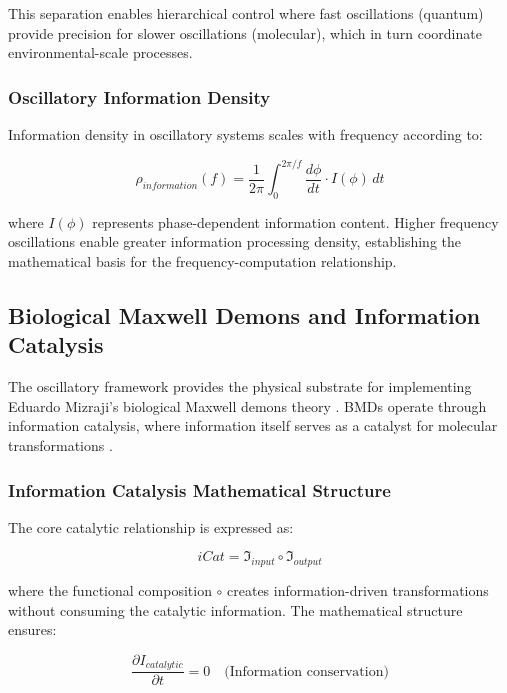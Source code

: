 This separation enables hierarchical control where fast oscillations (quantum) provide precision for slower oscillations (molecular), which in turn coordinate environmental-scale processes.

\subsubsection{Oscillatory Information Density}

Information density in oscillatory systems scales with frequency according to:

\begin{equation}
\rho_{information}(f) = \frac{1}{2\pi} \int_0^{2\pi/f} \frac{d\phi}{dt} \cdot I(\phi) \, dt
\end{equation}

where $I(\phi)$ represents phase-dependent information content. Higher frequency oscillations enable greater information processing density, establishing the mathematical basis for the frequency-computation relationship.

\subsection{Biological Maxwell Demons and Information Catalysis}

The oscillatory framework provides the physical substrate for implementing Eduardo Mizraji's biological Maxwell demons theory \cite{mizraji2007biological}. BMDs operate through information catalysis, where information itself serves as a catalyst for molecular transformations \cite{mizraji2007biological}.

\subsubsection{Information Catalysis Mathematical Structure}

The core catalytic relationship is expressed as:

\begin{equation}
iCat = \mathfrak{I}_{input} \circ \mathfrak{I}_{output}
\end{equation}

where the functional composition $\circ$ creates information-driven transformations without consuming the catalytic information. The mathematical structure ensures:

\begin{equation}
\frac{\partial I_{catalytic}}{\partial t} = 0 \quad \text{(Information conservation)}
\end{equation}

